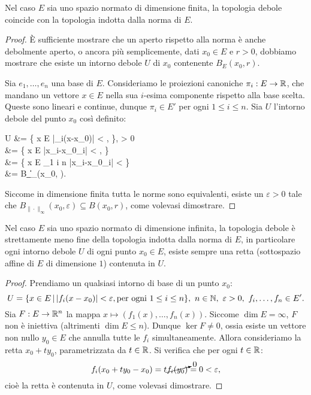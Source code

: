 \begin{theorem}
	Nel caso $E$ sia uno spazio normato di dimensione finita, la topologia debole coincide con la topologia indotta dalla norma di $E$.
\end{theorem}
\begin{proof}
	È sufficiente mostrare che un aperto rispetto alla norma è anche debolmente aperto, o ancora più semplicemente, dati $x_0 \in E$ e $r > 0$, dobbiamo mostrare che esiste un intorno debole $U$ di $x_0$ contenente $B_E(x_0, r)$.

	Sia $e_1, \ldots, e_n$ una base di $E$. Consideriamo le proiezioni canoniche $\pi_i : E \to \mathbb{R}$, che mandano un vettore $x \in E$ nella sua $i$-esima componente rispetto alla base scelta. Queste sono lineari e continue, dunque $\pi_i \in E'$ per ogni $1 \leq i \leq n$.
	Sia $U$ l'intorno debole del punto $x_0$ così definito:
	\begin{eqalign*}
		U &= \{ x \in E \suchthat |\pi_i(x-x_0)| < \varepsilon,  \}, \qquad \varepsilon > 0\\
		&= \{ x \in E \suchthat |x_i-{x_0}_i| < \varepsilon,  \}\\
		&= \{ x \in E \suchthat \max_{1 \leq i \leq n} |x_i-{x_0}_i| < \varepsilon \}\\
		&= B_{\|\cdot\|_\infty}(x_0, \varepsilon).
	\end{eqalign*}
	Siccome in dimensione finita tutta le norme sono equivalenti, esiste un $\varepsilon > 0$ tale che $B_{\|\cdot\|_\infty}(x_0, \varepsilon) \subseteq B(x_0, r)$, come volevasi dimostrare.
\end{proof}
\begin{theorem}
	Nel caso $E$ sia uno spazio normato di dimensione infinita, la topologia debole è strettamente meno fine della topologia indotta dalla norma di $E$, in particolare ogni intorno debole $U$ di ogni punto $x_0 \in E$, esiste sempre una retta (sottospazio affine di $E$ di dimensione $1$) contenuta in $U$.
\end{theorem}
\begin{proof}
	Prendiamo un qualsiasi intorno di base di un punto $x_0$:
	\begin{equation*}
		U = \{ x \in E \suchthat |f_i(x-x_0)| < \varepsilon, \text{per ogni $1 \leq i \leq n$} \}, \ n \in \N,\ \varepsilon > 0,\ f_i, \ldots, f_n \in E'.
	\end{equation*}
	Sia $F: E \to \mathbb{R}^n$ la mappa $x \mapsto (f_1(x), \ldots, f_n(x))$. Siccome $\dim E = \infty$, $F$ non è iniettiva (altrimenti $\dim E \leq n$). Dunque $\ker F \neq 0$, ossia esiste un vettore non nullo $y_0 \in E$ che annulla tutte le $f_i$ simultaneamente. Allora consideriamo la retta $x_0 + t y_0$, parametrizzata da $t \in \mathbb{R}$. Si verifica che per ogni $t \in \mathbb{R}$:
	\begin{equation*}
		f_i(x_0+ty_0 - x_0) = t \cancelto{0}{f_i(y_0)}=0 < \varepsilon,
	\end{equation*}
	cioè la retta è contenuta in $U$, come volevasi dimostrare.
\end{proof}

